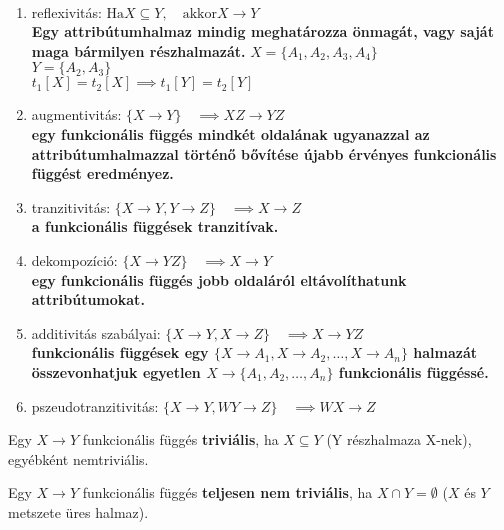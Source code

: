 \begin{theorem}~\\
	\begin{enumerate}[nosep]
		\item reflexivitás: $\text{Ha} X\subseteq Y,\quad \text{akkor} X \to Y$\\
			{\small\bfseries Egy attribútumhalmaz mindig meghatározza önmagát, vagy saját maga bármilyen részhalmazát.}
			{\footnotesize $X = \{A_1,A_2,A_3,A_4\}$\\
			$Y = \{A_2,A_3\}$\\
			$t_1[X] = t_2[X] \implies t_1[Y]=t_2[Y]$}
		\item augmentivitás: $\{X\to Y\}\quad \implies XZ \to YZ $\\
			{\small\bfseries egy funkcionális függés mindkét oldalának ugyanazzal az attribútumhalmazzal történő bővítése újabb érvényes funkcionális függést eredményez.}
			
		\item tranzitivitás: $\{X \to Y,Y \to Z\}\quad \implies X \to Z$\\
			{\small\bfseries a funkcionális függések tranzitívak.}
		\item dekompozíció: $\{X \to YZ\}\quad \implies X \to Y$\\
			{\small\bfseries egy funkcionális függés jobb oldaláról eltávolíthatunk attribútumokat.}
		\item additivitás szabályai: $\{X \to Y,X \to Z\}\quad \implies X \to YZ$\\
			{\small\bfseries funkcionális függések egy $\{X \to A_1 ,X \to A_2 ,\dots,X \to A_n \}$ halmazát összevonhatjuk egyetlen $X \to \{A_1 ,A_2 ,\dots,A_n \}$ funkcionális függéssé.}
		\item pszeudotranzitivitás: $\{X \to Y,WY \to Z\}\quad \implies WX \to Z$\\
	\end{enumerate}
\end{theorem}
\begin{definition}
	Egy $X \to Y$ funkcionális függés \textbf{triviális}, ha $X \subseteq Y$ (Y részhalmaza X-nek), egyébként nemtriviális.
\end{definition}
\begin{theorem}
	Egy $X \to Y$ funkcionális függés \textbf{teljesen nem triviális}, ha $X\cap Y=\emptyset$ ($X$ és $Y$ metszete üres halmaz).
\end{theorem}

